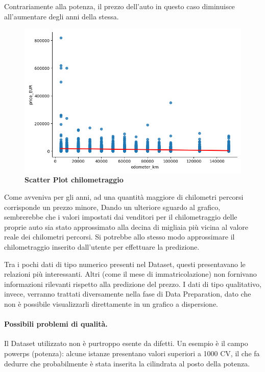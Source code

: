 Contrariamente alla potenza, il prezzo dell'auto in questo caso diminuisce all'aumentare degli anni della stessa.

\begin{figure}[H]
    \centering
    \includegraphics[scale=0.45]{Immagini/chilometraggio}
    \caption{\textbf{Scatter Plot chilometraggio}}
    \label{fig:odometer_km}
\end{figure}

Come avveniva per gli anni, ad una quantità maggiore di chilometri percorsi corrisponde un prezzo minore,
Dando un ulteriore sguardo al grafico, sembrerebbe che i valori impostati dai venditori per il chilometraggio delle proprie auto sia stato approssimato alla decina di migliaia più vicina al valore reale dei chilometri percorsi. Si potrebbe allo stesso modo approssimare il chilometraggio inserito dall'utente per effettuare la predizione.

Tra i pochi dati di tipo numerico presenti nel Dataset, questi presentavano le relazioni più interessanti. Altri (come il mese di immatricolazione) non fornivano informazioni rilevanti rispetto alla predizione del prezzo. I dati di tipo qualitativo, invece, verranno trattati diversamente nella fase di Data Preparation, dato che non è possibile visualizzarli direttamente in un grafico a dispersione.
\pagebreak

\paragraph{Possibili problemi di qualità.}
Il Dataset utilizzato non è purtroppo esente da difetti. Un esempio è il campo power\textunderscore ps (potenza): alcune istanze presentano valori superiori a 1000 CV, il che fa dedurre che probabilmente è stata inserita la cilindrata al posto della potenza. 

